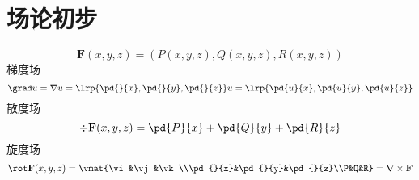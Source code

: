 
\section{场论初步}
\[\mathbf{F}(x,y,z)=(P(x,y,z),Q(x,y,z),R(x,y,z))\]
梯度场
\[\grad u=\nabla u=\lrp{\pd{}{x},\pd{}{y},\pd{}{z}}u=\lrp{\pd{u}{x},\pd{u}{y},\pd{u}{z}}\]
散度场
\[\div \mathbf{F}(x,y,z)=\pd{P}{x}+\pd{Q}{y}+\pd{R}{z}\]
旋度场
\[\rot \mathbf{F}(x,y,z)=\vmat{\vi&\vj&\vk\\\pd{}{x}&\pd{}{y}&\pd{}{z}\\P&Q&R}=\nabla\times\mathbf{F}\]